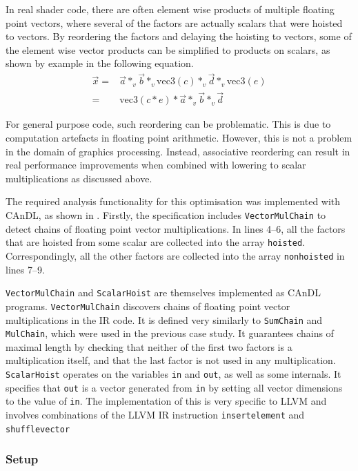     In real shader code, there are often element wise products of multiple
    floating point vectors, where several of the factors are actually scalars
    that were hoisted to vectors.
    By reordering the factors and delaying the hoisting to vectors, some of the
    element wise vector products can be simplified to products on scalars, as
    shown by example in the following equation.
    \begin{align*}
        \vec x={}&\vec a*_v\vec b*_v\text{vec3}(c)*_v\vec d*_v\text{vec3}(e)\\
        ={}&\text{vec3}(c*e)*\vec a*_v\vec b*_v\vec d
    \end{align*}

    For general purpose code, such reordering can be problematic.
    This is due to computation artefacts in floating point arithmetic.
    However, this is not a problem in the domain of graphics processing.
    Instead, associative reordering can result in real performance improvements
    when combined with lowering to scalar multiplications as discussed above.

    The required analysis functionality for this optimisation was implemented
    with CAnDL, as shown in .
    Firstly, the specification includes \texttt{VectorMulChain} to detect 
    chains of floating point vector multiplications.
    In lines 4--6, all the factors that are hoisted from some scalar are
    collected into the array {\tt hoisted}.
    Correspondingly, all the other factors are collected into the array
    {\tt nonhoisted} in lines 7--9.

    {\tt VectorMulChain} and {\tt ScalarHoist} are themselves implemented as
    CAnDL programs.
    {\tt VectorMulChain} discovers chains of floating point vector
    multiplications in the IR code.
    It is defined very similarly to {\tt SumChain} and {\tt MulChain}, which
    were used in the previous case study.
    It guarantees chains of maximal length by checking that neither of the first
    two factors is a multiplication itself, and that the last factor is not used
    in any multiplication.
    \texttt{ScalarHoist} operates on the variables {\tt in} and {\tt out}, as
    well as some internals.
    It specifies that {\tt out} is a vector generated from {\tt in} by setting
    all vector dimensions to the value of {\tt in}.
    The implementation of this is very specific to LLVM and involves
    combinations of the LLVM IR instruction {\tt insertelement} and
    {\tt shufflevector}

\subsubsection{Setup}

